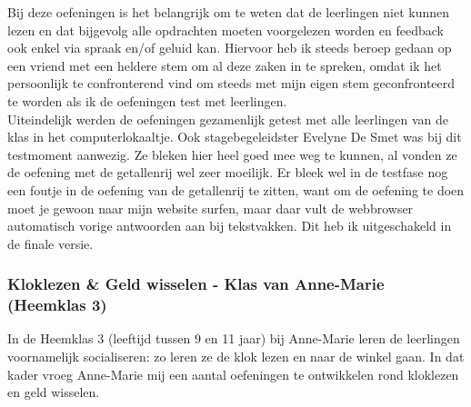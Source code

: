 \documentclass[a4paper,11pt]{article}
\theoremstyle{definition}
\begin{document}
\noindent Bij deze oefeningen is het belangrijk om te weten dat de leerlingen niet kunnen 
lezen en dat bijgevolg alle opdrachten moeten voorgelezen worden en feedback ook 
enkel via spraak en/of geluid kan. Hiervoor heb ik steeds beroep gedaan op een vriend 
met een heldere stem om al deze zaken in te spreken, omdat ik het persoonlijk te 
confronterend vind om steeds met mijn eigen stem geconfronteerd te worden als ik 
de oefeningen test met leerlingen. \\

\noindent Uiteindelijk werden de oefeningen gezamenlijk getest met alle 
leerlingen van de klas in het computerlokaaltje. Ook stagebegeleidster Evelyne De Smet was bij dit testmoment aanwezig.
 Ze bleken hier heel goed mee weg te kunnen, al vonden ze de oefening met de 
 getallenrij wel zeer moeilijk. Er bleek wel in de testfase nog een foutje in de 
 oefening van de getallenrij te zitten, want om de oefening te doen moet je gewoon naar mijn website surfen, 
maar daar vult de webbrowser automatisch vorige antwoorden aan bij tekstvakken. 
Dit heb ik uitgeschakeld in de finale versie.

\subsubsection{Kloklezen \& Geld wisselen - Klas van Anne-Marie (Heemklas 3)}
In de Heemklas 3 (leeftijd tussen 9 en 11 jaar) bij Anne-Marie leren de leerlingen 
voornamelijk socialiseren: zo leren ze de klok lezen en naar de winkel gaan. In 
dat kader vroeg Anne-Marie mij een aantal oefeningen te ontwikkelen rond 
kloklezen en geld wisselen.\\
\end{document}
